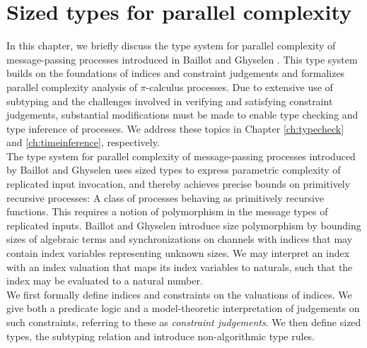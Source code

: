 \chapter{Sized types for parallel complexity}\label{ch:bgts}
In this chapter, we briefly discuss the type system for parallel complexity of message-passing processes introduced in Baillot and Ghyselen \cite{BaillotGhyselen2021}. This type system builds on the foundations of indices and constraint judgements and formalizes parallel complexity analysis of $\pi$-calculus processes. Due to extensive use of subtyping and the challenges involved in verifying and satisfying constraint judgements, substantial modifications must be made to enable type checking and type inference of processes. We address these topics in Chapter \ref{ch:typecheck} and \ref{ch:timeinference}, respectively.\\

The type system for parallel complexity of message-passing processes introduced by Baillot and Ghyselen uses sized types to express parametric complexity of replicated input invocation, and thereby achieves precise bounds on primitively recursive processes: A class of processes behaving as primitively recursive functions. This requires a notion of polymorphism in the message types of replicated inputs. Baillot and Ghyselen introduce size polymorphism by bounding sizes of algebraic terms and synchronizations on channels with indices that may contain index variables representing unknown sizes. We may interpret an index with an index valuation that maps its index variables to naturals, such that the index may be evaluated to a natural number.\\

We first formally define indices and constraints on the valuations of indices. We give both a predicate logic and a model-theoretic interpretation of judgements on such constraints, referring to these as \textit{constraint judgements}. We then define sized types, the subtyping relation and introduce non-algorithmic type rules.







